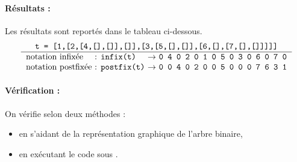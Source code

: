\paragraph{Résultats :} Les résultats sont reportés dans le tableau ci-dessous.
$$\begin{tabular}{l@{ : }l@{ $\rightarrow$ }r}
\multicolumn{3}{c}{\texttt{t = [1,[2,[4,[],[]],[]],[3,[5,[],[]],[6,[],[7,[],[]]]]]}}\\
\hline
notation infixée   & \texttt{infix(t)}   & \texttt{0 4 0 2 0 1 0 5 0 3 0 6 0 7 0} \\
notation postfixée & \texttt{postfix(t)} & \texttt{0 0 4 0 2 0 0 5 0 0 0 7 6 3 1}
\end{tabular}$$

\paragraph{Vérification :} On vérifie selon deux méthodes :
\begin{itemize}
\item en s'aidant de la représentation graphique de l'arbre binaire,
\item en exécutant le code sous \python.
\end{itemize}
\vspace*{3mm}

